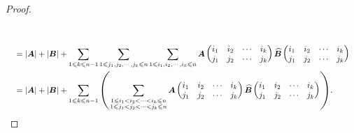 \documentclass[../../main.tex]{subfiles}%
\begin{document}
\begin{proof}
\begin{align*}
{{\begin{array}{c}
\begin{array}{c@{}c@{}c@{}c@{}c@{}c@{}c@{}c@{}c@{}c@{}c@{}}
\end{array}\\
\\
\end{array}}}
\\
&= |\boldsymbol{A}| + |\boldsymbol{B}| + \sum_{1\leqslant k\leqslant n - 1}\sum_{1\leqslant j_1,j_2,\cdots,j_k\leqslant n}\sum_{1\leqslant i_1,i_2,\cdots,i_k\leqslant n}\boldsymbol{A}\left(\begin{matrix}
i_1 & i_2 & \cdots & i_k\\
j_1 & j_2 & \cdots & j_k
\end{matrix}\right)\widehat{\boldsymbol{B}}\left(\begin{matrix}
i_1 & i_2 & \cdots & i_k\\
j_1 & j_2 & \cdots & j_k
\end{matrix}\right)
\\
&=|\boldsymbol{A}|+|\boldsymbol{B}|+\sum_{1\leqslant k\leqslant n-1}{\left( \sum_{\substack{1\leqslant i_1<i_2<\cdots <i_k\leqslant n\\1\leqslant j_1<j_2<\cdots <j_k\leqslant n}}{\boldsymbol{A}\left( \begin{matrix}
i_1&		i_2&		\cdots&		i_k\\
j_1&		j_2&		\cdots&		j_k\\
\end{matrix} \right) \widehat{\boldsymbol{B}}\left( \begin{matrix}
i_1&		i_2&		\cdots&		i_k\\
j_1&		j_2&		\cdots&		j_k\\
\end{matrix} \right)} \right)}.
\end{align*}

\end{proof}
\end{document}
